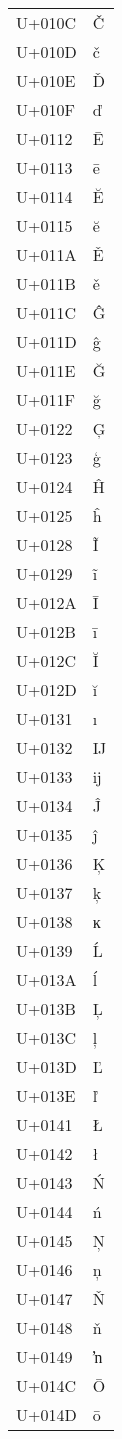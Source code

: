 \documentclass{article}
\begin{document}
\begin{longtable}{ll}
U+010C & Č \\
U+010D & č \\
U+010E & Ď \\
U+010F & ď \\
U+0112 & Ē \\
U+0113 & ē \\
U+0114 & Ĕ \\
U+0115 & ĕ \\
U+011A & Ě \\
U+011B & ě \\
U+011C & Ĝ \\
U+011D & ĝ \\
U+011E & Ğ \\
U+011F & ğ \\
U+0122 & Ģ \\
U+0123 & ģ \\
U+0124 & Ĥ \\
U+0125 & ĥ \\
U+0128 & Ĩ \\
U+0129 & ĩ \\
U+012A & Ī \\
U+012B & ī \\
U+012C & Ĭ \\
U+012D & ĭ \\
U+0131 & ı \\
U+0132 & Ĳ \\
U+0133 & ĳ \\
U+0134 & Ĵ \\
U+0135 & ĵ \\
U+0136 & Ķ \\
U+0137 & ķ \\
U+0138 & ĸ \\
U+0139 & Ĺ \\
U+013A & ĺ \\
U+013B & Ļ \\
U+013C & ļ \\
U+013D & Ľ \\
U+013E & ľ \\
U+0141 & Ł \\
U+0142 & ł \\
U+0143 & Ń \\
U+0144 & ń \\
U+0145 & Ņ \\
U+0146 & ņ \\
U+0147 & Ň \\
U+0148 & ň \\
U+0149 & ŉ \\
U+014C & Ō \\
U+014D & ō \\

\end{longtable}
\end{document}
